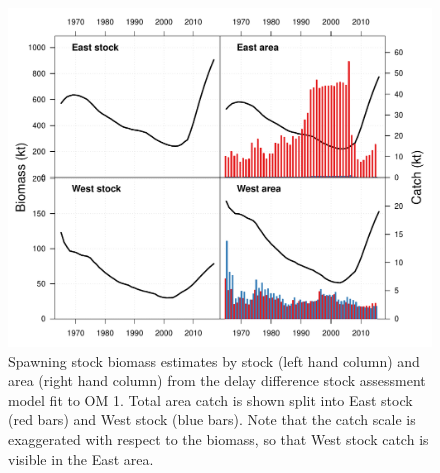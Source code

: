 \documentclass[]{article}
\begin{document}
\begin{figure}[htb]

{\centering \includegraphics[width=0.9\linewidth]{data/AM/1/biomass} 

}

\caption{Spawning stock biomass estimates by stock (left hand column) and area (right hand column) from the delay difference stock assessment model fit to OM 1. Total area catch is shown split into East stock (red bars) and West stock (blue bars). Note that the catch scale is exaggerated with respect to the biomass, so that West stock catch is visible in the East area.}\label{fig:amBiomassPlot}
\end{figure}

\newpage
\end{document}
